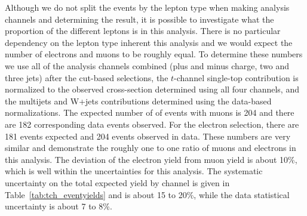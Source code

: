 Although we do not split the events by the lepton type when making analysis channels and determining the result, it is possible to investigate what the proportion of the different leptons is in this analysis.  There is no particular dependency on the lepton type inherent this analysis and we would expect the number of electrons and muons to be roughly equal.  To determine these numbers we use all of the analysis channels combined (plus and minus charge, two and three jets) after the cut-based selections, the $t$-channel single-top contribution is normalized to the observed cross-section determined using all four channels, and the multijets and W+jets contributions determined using the data-based normalizations.  The expected number of of events with muons is 204 and there are 182 corresponding data events observed.  For the electron selection, there are 181 events expected and 204 events observed in data.  These numbers are very similar and demonstrate the roughly one to one ratio of muons and electrons in this analysis.  The deviation of the electron yield from muon yield is about 10\%, which is well within the uncertainties for this analysis.  The systematic uncertainty on the total expected yield by channel is given in Table~\ref{tab:tch_eventyields} and is about 15 to 20\%, while the data statistical uncertainty is about 7 to 8\%.

